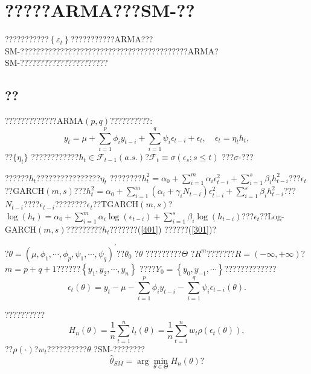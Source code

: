 \documentclass[a4paper,12pt,openany,oneside,utf-8]{ctexbook}
\begin{document}
	
	\chapter[?????ARMA???SM-??]{?????ARMA???SM-??}
	
	???????????$\left\{\varepsilon_t\right\}$???????????ARMA???SM-??????????????????????????????????????????ARMA?SM-??????????????????????
	
	\section{??}
	
	?????????????ARMA$(p,q)$??????????:
	\begin{equation}\label{401}
		y_t=\mu+\sum_{i=1}^p\phi_i y_{t-i}+\sum_{i=1}^q\psi_i\epsilon_{t-i}+\epsilon_t,\quad
		\epsilon_t = \eta_t h_t,
	\end{equation}
	??$\{\eta_t\}$ ????????????$h_t\in \mathcal{F}_{t-1}(a.s.)$?$\mathcal{F}_{t} \equiv \sigma\left(\epsilon_{s} ; s \leq t\right)$ ???$\sigma$-???
	
	??????$h_t$????????????????$\eta_t$ ????????$h_{t}^{2}=\alpha_{0}+\sum_{i=1}^m\alpha_{i} \epsilon_{t-i}^{2}+\sum_{i=1}^s\beta_{i}h_{t-i}^{2}$???$\epsilon_t$??GARCH$(m,s)$???$h_{t}^{2}=\alpha_{0}+\sum_{i=1}^m(\alpha_{i}+\gamma_iN_{t-i})\epsilon_{t-i}^{2}+\sum_{i=1}^s\beta_{i}h_{t-i}^{2}$???$N_{t-i}$????$\epsilon_{t-i}$????????$\epsilon_t$??TGARCH$(m,s)$?$\log(h_{t})=\alpha_{0}+\sum_{i=1}^m\alpha_{i} \log(\epsilon_{t-i})+\sum_{i=1}^s\beta_{i}\log(h_{t-i})$???$\epsilon_t$??Log-GARCH$(m,s)$?????????$h_t$???????(\ref{401}) ??????(\ref{301})?
	
	?$\theta=(\mu,\phi_1,\cdots,\phi_p,\psi_1,\cdots,\psi_q)^{\prime}$??$\theta_0$ ?$\theta$ ?????????$\Theta$ ?$R^m$???????$R=(-\infty,+\infty)$?$m=p+q+1$??????$\left\{y_1,y_2,\cdots,y_n\right\}$ ????$Y_0=\left\{y_0,y_{-1},\cdots\right\}$?????????????
	\begin{equation}\label{402}
		\epsilon_t(\theta)=y_t-\mu-\sum_{i=1}^p\phi_iy_{t-i}-\sum_{i=1}^q\psi_i\epsilon_{t-i}(\theta).
	\end{equation}
	
	??????????
	\begin{equation}\label{403}
		H_{n}(\theta)=\frac{1}{n}\sum_{t=1}^nl_t(\theta)=\frac{1}{n}\sum_{t=1}^nw_t\rho(\epsilon_t(\theta)),
	\end{equation}
	??$\rho(\cdot)$?$w_t$??????????$\theta$ ?SM-???????? $$\hat{\theta}_{SM}=\arg\min_{\theta\in\Theta}H_{n}(\theta)\mbox{?}$$
	
\end{document}
